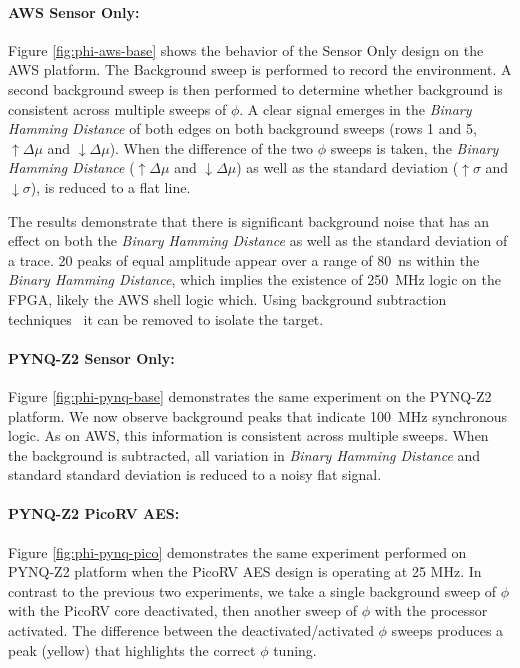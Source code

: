 

\paragraph{AWS Sensor Only: }
Figure \ref{fig:phi-aws-base} shows the behavior of the Sensor Only design on the AWS platform. The Background sweep is performed to record the environment. A second background sweep is then performed to determine whether background is consistent across multiple sweeps of $\phi$. A clear signal emerges in the \textit{Binary Hamming Distance} of both edges on both background sweeps (rows 1 and 5, $\uparrow\Delta\mu$ and $\downarrow\Delta\mu$). When the difference of the two $\phi$ sweeps is taken, the \textit{Binary Hamming Distance} ($\uparrow\Delta\mu$ and $\downarrow\Delta\mu$) as well as the standard deviation ($\uparrow\sigma$ and $\downarrow\sigma$), is reduced to a flat line. 

The results demonstrate that there is significant background noise that has an effect on both the \textit{Binary Hamming Distance} as well as the standard deviation of a trace. 20 peaks of equal amplitude appear over a range of 80~ns within the \textit{Binary Hamming Distance}, which implies the existence of 250~MHz logic on the FPGA, likely the AWS shell logic which. Using background subtraction techniques~\cite{piccardi2004background} it can be removed to isolate the target.

\paragraph{PYNQ-Z2 Sensor Only: }
Figure \ref{fig:phi-pynq-base} demonstrates the same experiment on the PYNQ-Z2 platform.
We now observe background peaks that indicate 100~MHz synchronous logic. 
As on AWS, this information is consistent across multiple sweeps.
When the background is subtracted, all variation in \textit{Binary Hamming Distance} and standard standard deviation is reduced to a noisy flat signal. 



\paragraph{PYNQ-Z2 PicoRV AES: }
Figure \ref{fig:phi-pynq-pico} demonstrates the same experiment performed on PYNQ-Z2 platform when the PicoRV AES design is operating at 25 MHz.
In contrast to the previous two experiments, we take a single background sweep of $\phi$ with the PicoRV core deactivated, then another sweep of $\phi$ with the processor activated.
The difference between the deactivated/activated $\phi$ sweeps produces a peak (yellow) that highlights the correct $\phi$ tuning.  %

